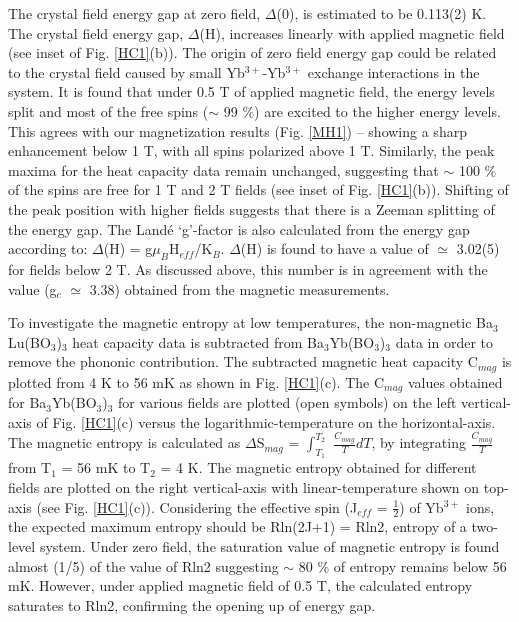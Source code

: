 \documentclass[aps,prl,reprint,showpacs,showkeys,superscriptaddress,floatfix,twocolumn]{revtex4-2}
\newcommand{\bybo}{Ba$_3$Yb(BO$_3$)$_3$}
\newcommand{\blbo}{Ba$_3$Lu(BO$_3$)$_3$}
\begin{document}
The crystal field energy gap at zero field, $\Delta$(0), is estimated to be  0.113(2) K. The crystal field energy gap, $\Delta$(H), increases linearly with applied magnetic field (see inset of Fig. \ref{HC1}(b)). The origin of zero field energy gap could be related to the crystal field caused by small Yb$^{3+}$-Yb$^{3+}$ exchange interactions in the system. It is found that under 0.5 T of applied magnetic field, the energy levels split and most of the free spins ($\sim$ 99 $\%$) are excited to the higher energy levels. This agrees with our magnetization results (Fig. \ref{MH1}) -- showing a sharp enhancement below 1 T, with all spins polarized above 1 T. Similarly, the peak maxima for the heat capacity data remain unchanged, suggesting that $\sim$ 100 \% of the spins are free for 1 T and 2 T fields (see inset of Fig. \ref{HC1}(b)). Shifting of the peak position with higher fields suggests that there is a Zeeman splitting of the energy gap. The Land\'e `g'-factor is also calculated from the energy gap according to: $\Delta$(H) = g$\mu_B$H$_{eff}$/K$_B$. $\Delta$(H) is found to have a value of $\simeq$ 3.02(5) for fields below 2 T. As discussed above, this number is in agreement with the value (g$_c$ $\simeq$ 3.38) obtained from the magnetic measurements. 

To investigate the magnetic entropy at low temperatures, the non-magnetic \blbo{} heat capacity data is subtracted from \bybo{} data in order to remove the phononic contribution. The subtracted magnetic heat capacity C$_{mag}$ is plotted from 4 K to 56 mK as shown in Fig. \ref{HC1}(c). The C$_{mag}$ values obtained for \bybo{} for various fields are plotted (open symbols) on the left vertical-axis of Fig. \ref{HC1}(c) versus the logarithmic-temperature on the horizontal-axis. The magnetic entropy is calculated as $\Delta$S$_{mag}$  = $\int_{T_1}^{T_2}$ $\frac{C_{mag}}{T}dT$, by integrating  $\frac{C_{mag}}{T}$ from T$_1$ = 56 mK to T$_2$ = 4 K. The magnetic entropy obtained for different fields are plotted on the right vertical-axis with linear-temperature shown on top-axis (see Fig. \ref{HC1}(c)). Considering the effective spin (J$_{eff}$ = $\frac{1}{2}$) of Yb$^{3+}$ ions, the expected maximum entropy should be Rln(2J+1) = Rln2, entropy of a two-level system. Under zero field, the saturation value of magnetic entropy is found almost (1/5) of the value of Rln2 suggesting $\sim$ 80 \% of entropy remains below 56 mK. However, under applied magnetic field of 0.5 T, the calculated entropy saturates to Rln2, confirming the opening up of energy gap.  
\end{document}

